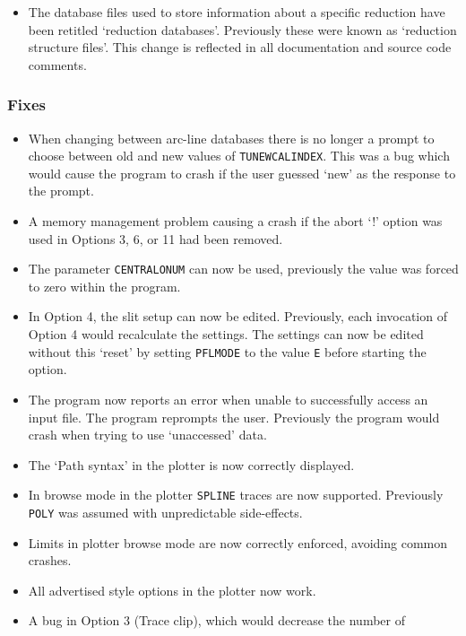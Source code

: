 \documentclass[twoside,11pt]{article}
\newcommand{\htmlref}[2]{#1}
\renewcommand{\_}{\texttt{\symbol{95}}}
\begin{document}
\begin{itemize}
\item The database files used to store information about a specific
   reduction have been retitled `reduction databases'.  Previously
   these were known as `reduction structure files'.  This change is
   reflected in all documentation and source code comments.
\end{itemize}

\subsubsection{Fixes}

\begin{itemize}
\item When changing between arc-line databases there is no longer
   a prompt to choose between old and new values of
   \htmlref{{\tt{TUNE\_WCAL\_INDEX}}}{par_TUNE_WCAL_INDEX}.
   This was a bug which would cause the program to crash if the user
   guessed `new' as the response to the prompt.
\item A memory management problem causing a crash if the abort `!'
   option was used in Options 3, 6, or 11 had been removed.
\item The parameter \htmlref{{\tt{CENTRAL\_ONUM}}}{par_CENTRAL_ONUM}
   can now be used, previously the
   value was forced to zero within the program.
\item In Option 4, the slit setup can now be edited.  Previously,
   each invocation of Option 4 would recalculate the settings.
   The settings can now be edited without this `reset' by setting
   \htmlref{{\tt{PFL\_MODE}}}{par_PFL_MODE} to the value \texttt{E}
   before starting the option.
\item The program now reports an error when unable to successfully
   access an input file.  The program reprompts the user.
   Previously the program would crash when trying to use `unaccessed'
   data.
\item The `Path syntax' in the plotter is now correctly displayed.
\item In browse mode in the plotter \texttt{SPLINE} traces are now supported.
   Previously \texttt{POLY} was assumed with unpredictable side-effects.
\item Limits in plotter browse mode are now correctly enforced, avoiding
   common crashes.
\item All advertised style options in the plotter now work.
\item A bug in Option 3 (Trace clip), which would decrease the number of

\end{itemize}
\end{document}
